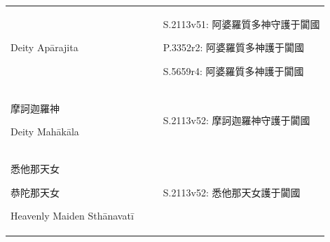 \documentclass[
  english,
  a4paper,
  DIV=12,
  footlines=2.1,
  usegeometry=true]{scrartcl}
\begin{document}
\begin{longtable}[]{@{}llll@{}}
\begin{minipage}[t]{0.18\columnwidth}
Deity Apārajita\strut
\end{minipage} & \begin{minipage}[t]{0.13\columnwidth}\raggedright
\strut
\end{minipage} & \begin{minipage}[t]{0.13\columnwidth}\raggedright
\strut
\end{minipage} & \begin{minipage}[t]{0.44\columnwidth}\raggedright
S.2113v51: 阿婆羅質多神守護于闐國

P.3352r2: 阿婆羅質多神護于闐國

S.5659r4: 阿婆羅質多神護于闐國\strut
\end{minipage}\tabularnewline
\begin{minipage}[t]{0.18\columnwidth}\raggedright
摩訶迦羅神

Deity Mahākāla\strut
\end{minipage} & \begin{minipage}[t]{0.13\columnwidth}\raggedright
\strut
\end{minipage} & \begin{minipage}[t]{0.13\columnwidth}\raggedright
\strut
\end{minipage} & \begin{minipage}[t]{0.44\columnwidth}\raggedright
S.2113v52: 摩訶迦羅神守護于闐國\strut
\end{minipage}\tabularnewline
\begin{minipage}[t]{0.18\columnwidth}\raggedright
悉他那天女

恭陀那天女

Heavenly Maiden Sthānavatī\strut
\end{minipage} & \begin{minipage}[t]{0.13\columnwidth}\raggedright
\strut
\end{minipage} & \begin{minipage}[t]{0.13\columnwidth}\raggedright
\strut
\end{minipage} & \begin{minipage}[t]{0.44\columnwidth}\raggedright
S.2113v52: 悉他那天女護于闐國


\end{minipage}
\end{longtable}
\end{document}
